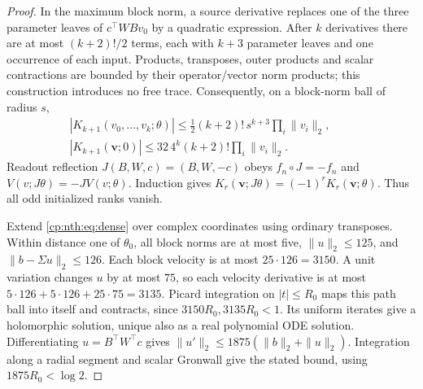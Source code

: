 \label{cp:nth:proof:source-control}{}

\begin{proof}
In the maximum block norm, a source derivative replaces one of the three
parameter leaves of \(c^\top WBv_0\) by a quadratic expression. After
\(k\) derivatives there are at most \((k+2)!/2\) terms, each with
\(k+3\) parameter leaves and one occurrence of each input. Products,
transposes, outer products and scalar contractions are bounded by their
operator/vector norm products; this construction introduces no free
trace. Consequently, on a block-norm ball of radius \(s\),
\begin{equation}\label{cp:nth:eq:leaf-bound}{\begin{gathered}
|K_{k+1}(v_0,\ldots,v_k;\theta)|
\le\tfrac12(k+2)!\,s^{k+3}\prod_i\|v_i\|_2,\qquad\\
|K_{k+1}(\mathbf v;0)|\le32\,4^k(k+2)!\prod_i\|v_i\|_2.
\end{gathered}}\end{equation} Readout reflection \(J(B,W,c)=(B,W,-c)\)
obeys \(f_n\circ J=-f_n\) and \(V(v;J\theta)=-JV(v;\theta)\). Induction
gives \(K_r(\mathbf v;J\theta)=(-1)^rK_r(\mathbf v;\theta)\). Thus all
odd initialized ranks vanish.

Extend \eqref{cp:nth:eq:dense} over complex coordinates
using ordinary transposes. Within distance one of \(\theta_0\), all
block norms are at most five, \(\|u\|_2\le125\), and
\(\|b-\Sigma u\|_2\le126\). Each block velocity is at most
\(25\cdot126=3150\). A unit variation changes \(u\) by at most \(75\),
so each velocity derivative is at most
\(5\cdot126+5\cdot126+25\cdot75=3135\). Picard integration on
\(|t|\le R_0\) maps this path ball into itself and contracts, since
\(3150R_0,3135R_0<1\). Its uniform iterates give a holomorphic solution,
unique also as a real polynomial ODE solution. Differentiating
\(u=B^\top W^\top c\) gives \(\|u'\|_2\le1875(\|b\|_2+\|u\|_2)\).
Integration along a radial segment and scalar Gronwall give the stated
bound, using \(1875R_0<\log2\).


\end{proof}
